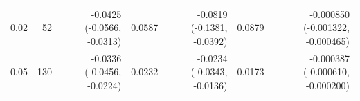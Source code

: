 \begin{tabular}{rrrrrrr}
0.02 & 52 & -0.0425 (-0.0566, -0.0313) & 0.0587 & -0.0819 (-0.1381, -0.0392) & 0.0879 & -0.000850 (-0.001322, -0.000465) \\
0.05 & 130 & -0.0336 (-0.0456, -0.0224) & 0.0232 & -0.0234 (-0.0343, -0.0136) & 0.0173 & -0.000387 (-0.000610, -0.000200) \\

\end{tabular}
